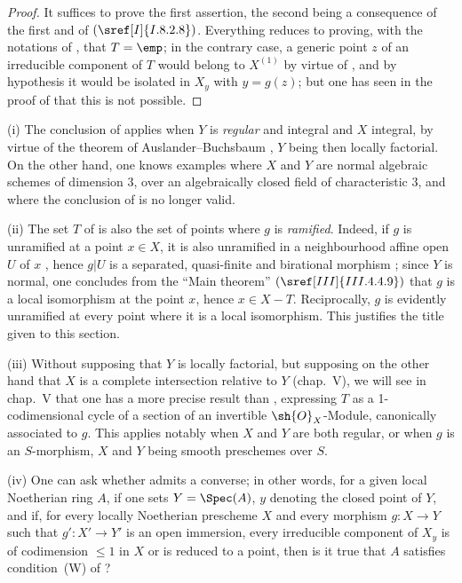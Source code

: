 \begin{proof}
It suffices to prove the first assertion, the second being a consequence of the first and of $(\sref[I]{I.8.2.8})$.
Everything reduces to proving, with the notations of , that $T=\emp$;
in the contrary case, a generic point $z$ of an irreducible component of $T$ would belong to $X^{(1)}$ by virtue of , and by hypothesis it would be isolated in $X_y$ with $y=g(z)$;
but one has seen in the proof of  that this is not possible.
\end{proof}

\begin{remark}[21.12.14]
\label{IV.21.12.14}
(i) The conclusion of  applies when $Y$ is \emph{regular} and integral and $X$ integral, by virtue of the theorem of Auslander--Buchsbaum , $Y$ being then locally factorial.
On the other hand, one knows examples where $X$ and $Y$ are normal algebraic schemes of dimension $3$, over an algebraically closed field of characteristic $3$, and where the conclusion of  is no longer valid.

(ii) The set $T$ of  is also the set of points where $g$ is \emph{ramified}.
Indeed, if $g$ is unramified at a point $x\in X$, it is also unramified in a neighbourhood affine open $U$ of $x$ , hence $g|U$ is a separated, quasi-finite and birational morphism ;
since $Y$ is normal, one concludes from the ``Main theorem'' $(\sref[III]{III.4.4.9})$ that $g$ is a local isomorphism at the point $x$, hence $x\in X-T$.
Reciprocally, $g$ is evidently unramified at every point where it is a local isomorphism.
This justifies the title given to this section.

(iii) Without supposing that $Y$ is locally factorial, but supposing on the other hand that $X$ is a complete intersection relative to $Y$ (chap.~V), we will see in chap.~V that one has a more precise result than , expressing $T$ as a 1-codimensional cycle of a section of an invertible $\sh{O}_X$-Module, canonically associated to $g$.
This applies notably when $X$ and $Y$ are both regular, or when $g$ is an $S$-morphism, $X$ and $Y$ being smooth preschemes over $S$.

(iv) One can ask whether  admits a converse; in other words, for a given local Noetherian ring $A$, if one sets $Y=\Spec(A)$, $y$ denoting the closed point of $Y$, and if, for every locally Noetherian prescheme $X$ and every morphism $g:X\to Y$ such that $g':X'\to Y'$ is an open immersion, every irreducible component of $X_y$ is of codimension $\leq 1$ in $X$ or is reduced to a point, then is it true that $A$ satisfies condition~(W) of ?


\end{remark}

